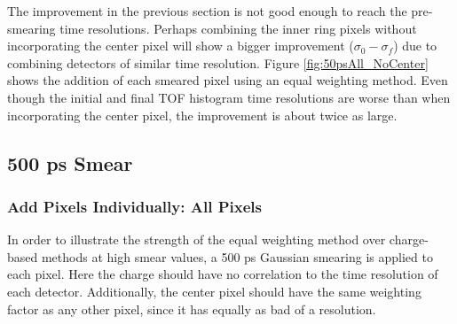 \documentclass[12pt]{article}
\begin{document}
The improvement in the previous section is not good enough to reach the pre-smearing time resolutions. 
Perhaps combining the inner ring pixels without incorporating the center pixel will show a bigger improvement ($\sigma_0-\sigma_f$) due to combining detectors of similar time resolution. 
Figure \ref{fig:50psAll_NoCenter} shows the addition of each smeared pixel using an equal weighting method.
Even though the initial and final TOF histogram time resolutions are worse than when incorporating the center pixel, the improvement is about twice as large.

\subsection{500 ps Smear}
\subsubsection{Add Pixels Individually: All Pixels}
In order to illustrate the strength of the equal weighting method over charge-based methods at high smear values, a 500 ps Gaussian smearing is applied to each pixel.
Here the charge should have no correlation to the time resolution of each detector.
Additionally, the center pixel should have the same weighting factor as any other pixel, since it has equally as bad of a resolution.
\end{document}
